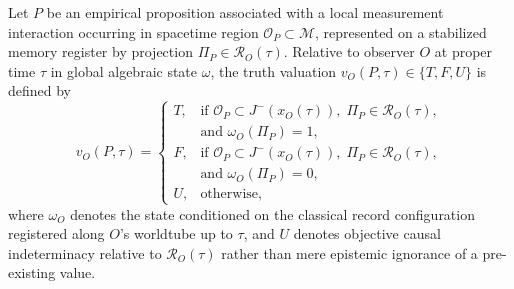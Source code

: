 \begin{definition}
Let $P$ be an empirical proposition associated with a local measurement interaction occurring in spacetime region $\mathcal{O}_P \subset \mathcal{M}$, represented on a stabilized memory register by projection $\Pi_P \in \mathcal{R}_O(\tau)$. Relative to observer $O$ at proper time $\tau$ in global algebraic state $\omega$, the truth valuation $v_O(P, \tau) \in \{T, F, U\}$ is defined by
\begin{equation}
    v_O(P, \tau) =
    \begin{cases}
        T, & \text{if } \mathcal{O}_P \subset J^-(x_O(\tau)), \; \Pi_P \in \mathcal{R}_O(\tau), \\
           & \text{and } \omega_O(\Pi_P) = 1, \\
        F, & \text{if } \mathcal{O}_P \subset J^-(x_O(\tau)), \; \Pi_P \in \mathcal{R}_O(\tau), \\
           & \text{and } \omega_O(\Pi_P) = 0, \\
        U, & \text{otherwise,}
    \end{cases}
    \label{eq:cah_valuation}
\end{equation}
where $\omega_O$ denotes the state conditioned on the classical record configuration registered along $O$'s worldtube up to $\tau$, and $U$ denotes objective causal indeterminacy relative to $\mathcal{R}_O(\tau)$ rather than mere epistemic ignorance of a pre-existing value.
\end{definition}

